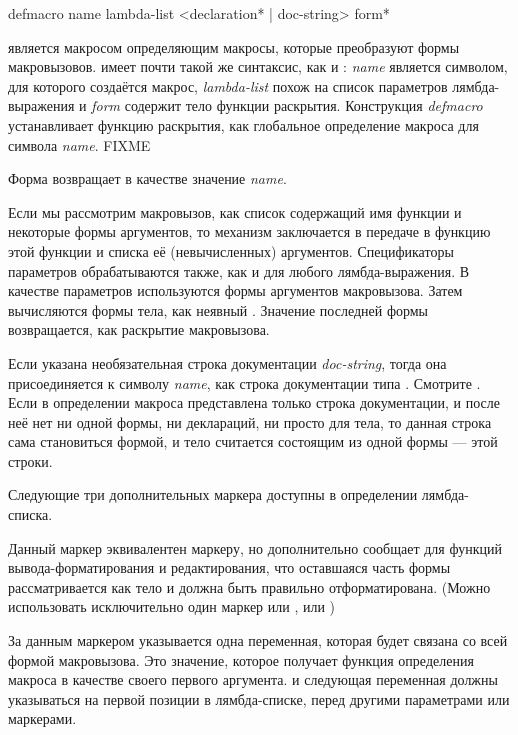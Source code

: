 \begin{defmac}
defmacro name lambda-list <{declaration}* | doc-string> {form}*

 является макросом определяющим макросы, которые преобразуют формы
макровызовов.
 имеет почти такой же синтаксис, как и :
\emph{name} является символом, для которого создаётся макрос,
\emph{lambda-list} похож на список параметров лямбда-выражения и 
\emph{form} содержит тело функции раскрытия.
Конструкция \emph{defmacro} устанавливает функцию раскрытия, как глобальное
определение макроса для символа \emph{name}.
FIXME

Форма  возвращает в качестве значение \emph{name}.

Если мы рассмотрим макровызов, как список содержащий имя функции и некоторые
формы аргументов, то механизм заключается в передаче в функцию  этой
функции и списка её (невычисленных) аргументов.
Спецификаторы параметров обрабатываются также, как и для любого лямбда-выражения.
В качестве параметров используются формы аргументов макровызова.
Затем вычисляются формы тела, как неявный . Значение последней формы
возвращается, как раскрытие макровызова.

Если указана необязательная строка документации \emph{doc-string}, тогда она
присоединяется к символу \emph{name}, как строка документации типа
. Смотрите .
Если в определении макроса представлена только строка документации, и после неё
нет ни одной формы, ни деклараций, ни просто для тела, то данная строка сама
становиться формой, и тело считается состоящим из одной формы --- этой строки.

Следующие три дополнительных маркера доступны в определении лямбда-списка.
\begin{indentdesc}{6pc}
\item[\cd{\&body}]

Данный маркер эквивалентен  маркеру, но дополнительно сообщает для
функций вывода-форматирования и редактирования, что оставшаяся часть формы
рассматривается как тело и должна быть правильно отформатирована.
(Можно использовать исключительно один маркер или , или )

\item[\cd{\&whole}]
За данным маркером указывается одна переменная, которая будет связана со всей
формой макровызова. Это значение, которое получает функция определения макроса в
качестве своего первого аргумента.
 и следующая переменная должны указываться на первой позиции в
лямбда-списке, перед другими параметрами или маркерами.


\end{indentdesc}
\end{defmac}
